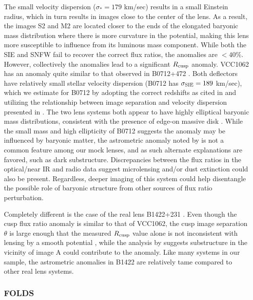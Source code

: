 \begin{itemize}
	\vspace{1cm}  The small velocity dispersion ($\sigma_* = 179$ km/sec) results in a small Einstein radius, which in turn results in images close to the center of the lens. As a result, the images S2 and M2 are located closer to the ends of the elongated baryonic mass distribution where there is more curvature in the potential, making this lens more susceptible to influence from its luminous mass component. While both the SIE and SNFW fail to recover the correct flux ratios, the anomalies are $<40\%$. However, collectively the anomalies lead to a significant $R_{\rm{cusp}}$ anomaly. VCC1062 has an anomaly quite similar to that observed in B0712+472 \citep{Jackson++98}. Both deflectors have relatively small stellar velocity dispersion (B0712 has $\sigma_{\rm{SIE}} = 189$ km/sec), which we estimate for B0712 by adopting the correct redshifts as cited in \citet{Sluse++12} and utilizing the relationship between image separation and velocity dispersion presented in \citet{Kochanek++00}. The two lens systems both appear to have highly elliptical baryonic mass distributions, consistent with the presence of edge-on massive disk \citep{Jackson++98}. While the small mass and high ellipticity of B0712 suggests the anomaly may be influenced by baryonic matter, the astrometric anomaly noted by \citet{Kawano++04} is not a common feature among our mock lenses, and as such alternate explanations are favored, such as dark substructure. Discrepancies between the flux ratios in the optical/near IR and radio data suggest microlensing and/or dust extinction could also be present. Regardless, deeper imaging of this system could help disentangle the possible role of baryonic structure from other sources of flux ratio perturbation. 
	
	\vspace{1cm} Completely different is the case of the real lens B1422+231 \citep{Patnaik++92}. Even though the cusp flux ratio anomaly is similar to that of VCC1062, the cusp image separation $\theta$ is large enough that the measured $R_{\rm{cusp}}$ value \citep{Koopmans++03} alone is not inconsistent with lensing by a smooth potential \citep{Keeton03}, while the analysis by \citet{Nierenberg++14,Xu++15} suggests substructure in the vicinity of image A could contribute to the anomaly. Like many systems in our sample, the astrometric anomalies in B1422 are relatively tame compared to other real lens systems.
\end{itemize}
\subsubsection{\rm{FOLDS}}


